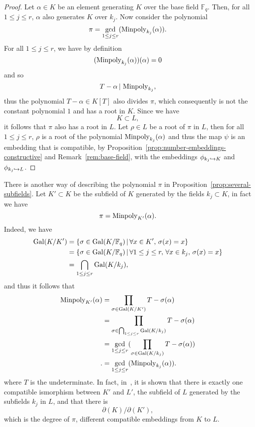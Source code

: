 \begin{proof}
  Let $\alpha\in K$ be an element generating $K$ over the base field
  $\mathbb{F}_q$. Then, for all $1\leq j\leq r$, $\alpha$ also generates $K$
  over $k_j$. Now consider the polynomial
  \[
    \pi = \gcd_{1\leq j\leq r}(\operatorname{Minpoly}_{k_j}(\alpha)).
  \]
  For all $1\leq j\leq r$, we have by definition
  \[
    (\operatorname{Minpoly}_{k_j}(\alpha))(\alpha) = 0
  \]
  and so
  \[
    T-\alpha\,|\,\operatorname{Minpoly}_{k_j},
  \]
  thus the polynomial $T-\alpha\in K[T]$ also divides $\pi$, which consequently is not the constant
  polynomial $1$ and has a root in $K$. Since we have
  \[
    K\subset L,
  \]
  it follows that $\pi$ also has a root in $L$. Let $\rho\in L$ be a root of $\pi$
  in $L$, then for all $1\leq j\leq r$, $\rho$ is a root of
  the polynomial $\operatorname{Minpoly}_{k_j}(\alpha)$ and thus the map $\psi$ is an
  embedding that is compatible, by
  Proposition~\ref{prop:number-embeddings-constructive} and
  Remark~\ref{rem:base-field}, with the embeddings
  $\phi_{k_j\hookrightarrow K}$ and $\phi_{k_j\hookrightarrow L}$.
\end{proof}
\begin{rem}
  There is another way of describing the polynomial $\pi$ in
  Proposition~\ref{prop:several-subfields}. Let $K'\subset K$ be the
  subfield of $K$ generated by the fields $k_j\subset K$, in fact we have
  \[
    \pi = \operatorname{Minpoly}_{K'}(\alpha).
  \]
  Indeed, we have
  \begin{align*}
    \operatorname{Gal}(K/K') &= \left\{ \sigma\in\operatorname{Gal}(K/\mathbb{F}_q)\,|\,\forall x\in
  K',\,\sigma(x) = x \right\}\\
  &= \left\{ \sigma\in\operatorname{Gal}(K/\mathbb{F}_q)\,|\,\forall 1\leq j\leq r,\,\forall x\in
  k_j,\,\sigma(x) = x \right\}\\
  &= \bigcap_{1\leq j\leq r}\operatorname{Gal}(K/k_j),
  \end{align*}
  and thus it follows that
  \begin{align*}
    \operatorname{Minpoly}_{K'}(\alpha) &= \prod_{\sigma\in\operatorname{Gal}(K/K')}T-\sigma(\alpha)\\
    &=\prod_{\sigma\in\bigcap_{1\leq j\leq r}\operatorname{Gal}(K/k_j)}T-\sigma(\alpha)\\
    &= \gcd_{1\leq j\leq r}(\prod_{\sigma\in\operatorname{Gal}(K/k_j)}T-\sigma(\alpha))\\.
    &= \gcd_{1\leq j\leq r}(\operatorname{Minpoly}_{k_j}(\alpha)).
  \end{align*}
  where $T$ is the undeterminate. In fact, in~\cite{BCS97}, it is shown that
  there is exactly one compatible ismorphism between $K'$ and $L'$, the subfield
  of $L$ generated by the subfields $k_j$ in $L$, and that there is
  \[
    \partial(K)/\partial(K'),
  \]
  which is the degree of $\pi$, different compatible embeddings from $K$ to $L$.
\end{rem}

